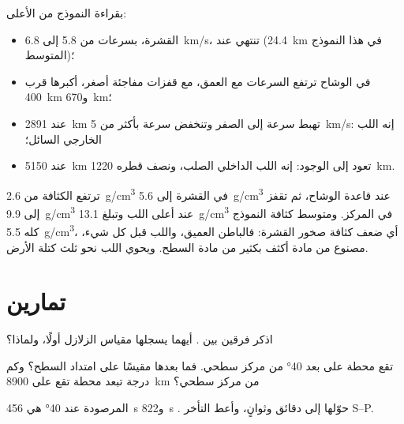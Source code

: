 بقراءة النموذج من الأعلى:
\begin{itemize}
  \item القشرة، بسرعات  من 5.8 إلى \qty{6.8}{km/s}، تنتهي عند 
        (\qty{24.4}{km} في هذا النموذج المتوسط)؛
  \item في الوشاح ترتفع السرعات مع العمق، مع قفزات
        مفاجئة أصغر، أكبرها قرب \qty{400}{km} و\qty{670}{km}؛
  \item عند \qty{2891}{km} تهبط سرعة  إلى الصفر وتنخفض سرعة 
        بأكثر من \qty{5}{km/s}: إنه اللب الخارجي السائل؛
  \item عند \qty{5150}{km} تعود  إلى الوجود: إنه اللب الداخلي الصلب،
        ونصف قطره \qty{1220}{km}.
\end{itemize}

ترتفع الكثافة من \qty{2.6}{g/cm^3} في القشرة إلى
\qty{5.6}{g/cm^3} عند قاعدة الوشاح، ثم تقفز إلى
\qty{9.9}{g/cm^3} عند أعلى اللب وتبلغ \qty{13.1}{g/cm^3} في
المركز. ومتوسط كثافة النموذج كله \qty{5.5}{g/cm^3}، أي ضعف
كثافة صخور القشرة: فالباطن العميق، واللب قبل كل شيء،
مصنوع من مادة أكثف بكثير من مادة السطح. ويحوي اللب نحو
ثلث كتلة الأرض.

\section{تمارين}

\begin{exercise}[$\star$]\label{exo:g11:seismic-structure:1}
اذكر فرقين بين  . أيهما يسجلها مقياس الزلازل أولًا،
ولماذا؟
\end{exercise}

\begin{exercise}[$\star$]\label{exo:g11:seismic-structure:2}
تقع محطة على بعد \ang{40} من مركز سطحي. فما بعدها مقيسًا على امتداد
السطح؟ وكم درجة تبعد محطة تقع على \qty{8900}{km} من
مركز سطحي؟
\end{exercise}

\begin{exercise}[$\star$]\label{exo:g11:seismic-structure:3}
 المرصودة عند \ang{40} هي \qty{456}{s}  و\qty{822}{s}
. حوّلها إلى دقائق وثوانٍ، وأعط التأخر
S--P.
\end{exercise}


